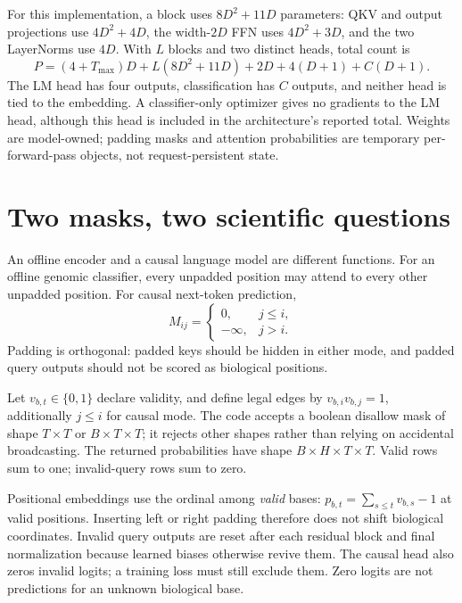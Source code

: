 For this implementation, a block uses $8D^2+11D$ parameters: QKV and output
projections use $4D^2+4D$, the width-$2D$ FFN uses $4D^2+3D$, and the two
LayerNorms use $4D$. With $L$ blocks and two distinct heads, total count is
\begin{equation}
P=(4+T_{\max})D+L(8D^2+11D)+2D+4(D+1)+C(D+1).
\label{evod23:params}
\end{equation}
The LM head has four outputs, classification has $C$ outputs, and neither head is
tied to the embedding. A classifier-only optimizer gives no gradients to the LM
head, although this head is included in the architecture's reported total.
Weights are model-owned; padding masks and attention probabilities are temporary
per-forward-pass objects, not request-persistent state.

\section{Two masks, two scientific questions}

An offline encoder and a causal language model are different functions. For an
offline genomic classifier, every unpadded position may attend to every other
unpadded position. For causal next-token prediction,
\[
M_{ij}=\begin{cases}
0,&j\le i,\\
-\infty,&j>i.
\end{cases}
\]
Padding is orthogonal: padded keys should be hidden in either mode, and padded query
outputs should not be scored as biological positions.

Let $v_{b,t}\in\{0,1\}$ declare validity, and define legal edges by
$v_{b,i}v_{b,j}=1$, additionally $j\le i$ for causal mode.
The code accepts a boolean disallow mask of shape $T\times T$ or
$B\times T\times T$; it rejects other shapes rather than relying on accidental
broadcasting. The returned probabilities have shape $B\times H\times T\times T$.
Valid rows sum to one; invalid-query rows sum to zero.

Positional embeddings use the ordinal among \emph{valid} bases:
$p_{b,t}=\sum_{s\le t}v_{b,s}-1$ at valid positions. Inserting left or right padding
therefore does not shift biological coordinates. Invalid query outputs are reset
after each residual block and final normalization because learned biases otherwise
revive them. The causal head also zeros invalid logits; a training loss must still
exclude them. Zero logits are not predictions for an unknown biological base.

